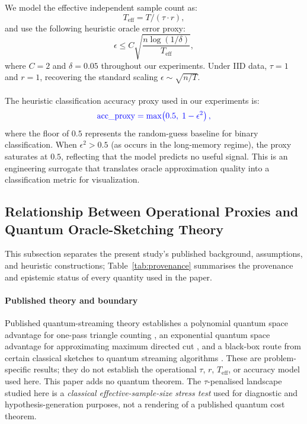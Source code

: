 \documentclass[sensors,article,submit,pdftex,moreauthors]{Definitions/mdpi}
\newcommand{\Teff}{T_{\mathrm{eff}}}
\providecommand{\DIFadd}[1]{{\protect\color{blue}#1}} %
\providecommand{\DIFdel}[1]{} %
\providecommand{\DIFaddbegin}{} %
\providecommand{\DIFdelbegin}{} %
\providecommand{\DIFdelend}{} %
\begin{document}
We model the effective independent sample count as:
\begin{equation}
\Teff = T / (\tau \cdot r),
\label{eq:teff}
\end{equation}
and use the following heuristic oracle error proxy:
\begin{equation}
\epsilon \leq C \sqrt{\frac{n \log(1/\delta)}{\Teff}},
\label{eq:oracle_error}
\end{equation}
where $C = 2$ and $\delta = 0.05$ throughout our experiments. Under IID data, $\tau = 1$ and $r = 1$, recovering the standard scaling $\epsilon \sim \sqrt{n/T}$.

\DIFdelbegin \paragraph{\DIFdel{Relation to the exact framework}} %
\addtocounter{paragraph}{-1}%
\DIFdel{Two deliberate simplifications distinguish Eqs. ~\eqref{eq:teff}}\DIFdelend \DIFaddbegin \DIFadd{The heuristic classification accuracy proxy used in our experiments is:
}\begin{equation}
\DIFadd{\mathrm{acc\_proxy} = \max\!\left(0.5,\; 1 - \epsilon^2\right),
\label{eq:acc_proxy}
}\end{equation}
\DIFadd{where the floor of $0.5$ represents the random-guess baseline for binary classification. When $\epsilon^2 > 0.5$ (as occurs in the long-memory regime), the proxy saturates at $0.5$, reflecting that the model predicts no useful signal. This is an engineering surrogate that translates oracle approximation quality into a classification metric for visualization.
}

\subsection{\DIFadd{Relationship Between Operational Proxies and Quantum Oracle-Sketching Theory}}
\label{sec:proxy_theory}

\DIFadd{This subsection separates the present study's published background, assumptions, and heuristic constructions; Table~\ref{tab:provenance} summarises the provenance and epistemic status of every quantity used in the paper.
}

\paragraph{\DIFadd{Published theory and boundary}} \DIFadd{Published quantum-streaming theory establishes a polynomial quantum space advantage for one-pass triangle counting }\citep{kallaugher2021streaming}\DIFadd{, an exponential quantum space advantage for approximating maximum directed cut }\citep{kallaugher2024maxdicut}\DIFadd{, and a black-box route from certain classical sketches to quantum streaming algorithms }\citep{kallaugher2025designquantum}\DIFadd{. These are problem-specific results; they do not establish the operational $\tau$, $r$, $\Teff$, or accuracy model used here. This paper adds no quantum theorem. The $\tau$-penalised landscape studied here is a }\emph{\DIFadd{classical effective-sample-size stress test}} \DIFadd{used for diagnostic and hypothesis-generation purposes, not a rendering of a published quantum cost theorem.
}
\end{document}
